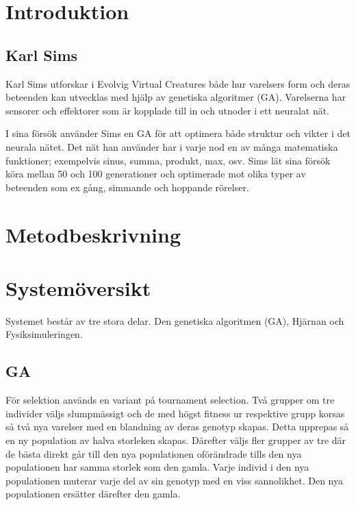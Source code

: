 \documentclass[titlepage, a4paper, 12pt]{article}
\begin{document}
\section{Introduktion}

\subsection{Karl Sims}
Karl Sims utforskar i Evolvig Virtual Creatures \cite{sims} både hur varelsers form och deras beteenden kan utvecklas med hjälp av genetiska algoritmer (GA). Varelserna har sensorer och effektorer som är kopplade till in och utnoder i ett neuralat nät. 

I sina försök använder Sims en GA för att optimera både struktur och vikter i det neurala nätet. Det nät han använder har i varje nod en av många matematiska funktioner; exempelvis sinus, summa, produkt, max, osv. Sims lät sina försök köra mellan 50 och 100 generationer och optimerade mot olika typer av beteenden som ex gång, simmande och hoppande rörelser. 


\section{Metodbeskrivning}

\section{Systemöversikt}
	Systemet består av tre stora delar. Den genetiska algoritmen (GA), Hjärnan och Fysiksimuleringen. 

	\subsection{GA}
	

		För selektion används en variant på tournament selection. Två grupper om tre individer väljs slumpmässigt och de med högst fitness ur respektive grupp korsas så två nya varelser med en blandning av deras genotyp skapas. Detta upprepas så en ny population av halva storleken skapas. Därefter väljs fler grupper av tre där de bästa direkt går till den nya populationen oförändrade tills den nya populationen har samma storlek som den gamla. Varje individ i den nya populationen muterar varje del av sin genotyp med en viss sannolikhet. Den nya populationen ersätter därefter den gamla. 
		
\end{document}
